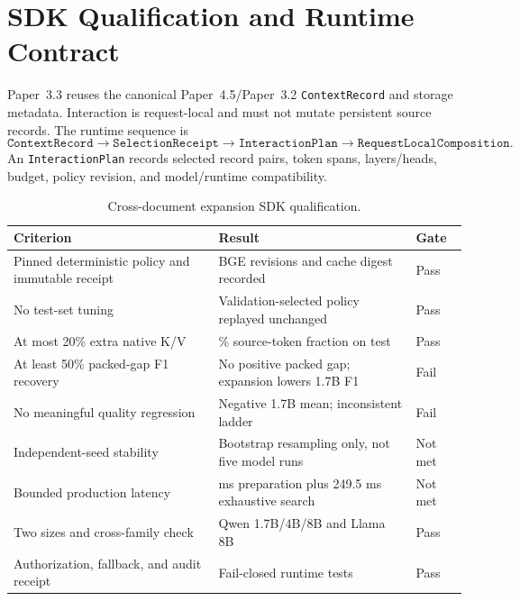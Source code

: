 \documentclass[11pt]{article}
\begin{document}



\appendix

\section{SDK Qualification and Runtime Contract}
\label{app:sdk-gate}

Paper~3.3 reuses the canonical Paper~4.5/Paper~3.2 \texttt{ContextRecord} and
storage metadata. Interaction is request-local and must not mutate persistent
source records. The runtime sequence is
\[
\texttt{ContextRecord}
\rightarrow
\texttt{SelectionReceipt}
\rightarrow
\texttt{InteractionPlan}
\rightarrow
\texttt{RequestLocalComposition}.
\]
An \texttt{InteractionPlan} records selected record pairs, token spans,
layers/heads, budget, policy revision, and model/runtime compatibility.

\begin{table}[H]
\centering
\small
\caption{Cross-document expansion SDK qualification.}
\label{tab:expansion-sdk-gate}
\begin{tabular}{>{\raggedright\arraybackslash}p{.40\linewidth}>{\raggedright\arraybackslash}p{.40\linewidth}>{\raggedright\arraybackslash}p{.09\linewidth}}
\toprule
Criterion & Result & Gate \\
\midrule
Pinned deterministic policy and immutable receipt & BGE revisions and cache digest recorded & Pass \\
No test-set tuning & Validation-selected policy replayed unchanged & Pass \\
At most 20\% extra native K/V & 12.65\% source-token fraction on test & Pass \\
At least 50\% packed-gap F1 recovery & No positive packed gap; expansion lowers 1.7B F1 & Fail \\
No meaningful quality regression & Negative 1.7B mean; inconsistent ladder & Fail \\
Independent-seed stability & Bootstrap resampling only, not five model runs & Not met \\
Bounded production latency & 370.3 ms preparation plus 249.5 ms exhaustive search & Not met \\
Two sizes and cross-family check & Qwen 1.7B/4B/8B and Llama 8B & Pass \\
Authorization, fallback, and audit receipt & Fail-closed runtime tests & Pass \\
\bottomrule
\end{tabular}
\end{table}
\end{document}
